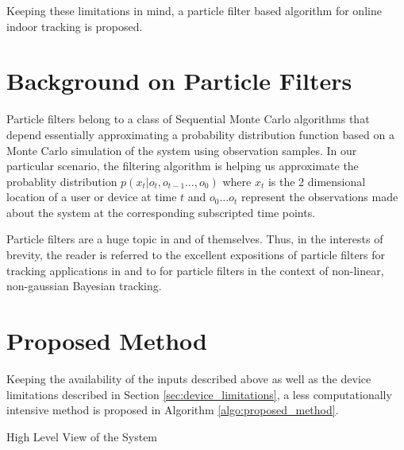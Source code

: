 Keeping these limitations in mind, a particle filter based algorithm 
for online indoor tracking is proposed. 

\section{Background on Particle Filters}
Particle filters belong to a class of Sequential Monte Carlo algorithms 
that depend essentially approximating a probability distribution function based
on a Monte Carlo simulation of the system using observation samples. In our 
particular scenario, the filtering algorithm is helping us approximate the 
probablity distribution $p(x_t|o_t,o_{t-1}\dots,o_0)$ where $x_t$ is the 2
dimensional location of a user or device at time $t$ and $o_0 \dots o_t$
represent the observations made about the system at the corresponding
subscripted time points.

Particle filters are a huge topic in and of themselves. Thus, in the interests
of brevity, the reader is referred to the excellent expositions of particle 
filters for tracking applications in \cite{Ristic} and to \cite{Arulampalam}
for particle filters in the context of non-linear, non-gaussian Bayesian
tracking.


\section{Proposed Method}

Keeping the availability of the inputs described above as well as the device 
limitations described in Section \ref{sec:device_limitations}, a less 
computationally intensive method is proposed in 
Algorithm \ref{algo:proposed_method}.

\begin{algorithm}
\caption{High Level View of the System\label{algo:proposed_method}}
\end{algorithm}

